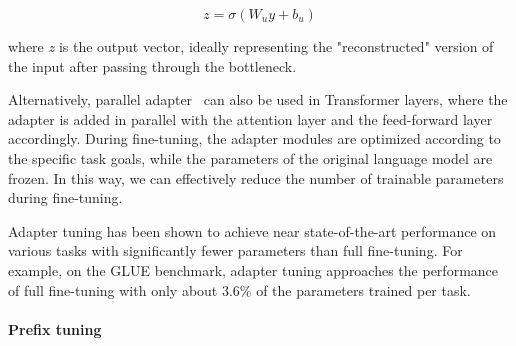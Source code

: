 \begin{equation}
	z = \sigma (W_{u}y + b_u)
	\label{eq:adapter-expansion}
\end{equation}

\noindent where \textit{z} is the output vector, ideally representing the "reconstructed" version of the input after passing through the bottleneck.

Alternatively, parallel adapter~\cite{he2022unified} can also be used in Transformer layers, where the adapter is added in parallel with the attention layer and the feed-forward layer accordingly.
During fine-tuning, the adapter modules are optimized according to the specific task goals, while the parameters of the original language model are frozen.
In this way, we can effectively reduce the number of trainable parameters during fine-tuning.

Adapter tuning has been shown to achieve near state-of-the-art performance on various tasks with significantly fewer parameters than full fine-tuning.
For example, on the GLUE benchmark, adapter tuning approaches the performance of full fine-tuning with only about 3.6\% of the parameters trained per task.

\paragraph{Prefix tuning}
\label{subsubsec:prefix-tuning}

